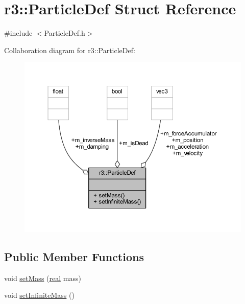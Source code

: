 \hypertarget{structr3_1_1_particle_def}{}\section{r3\+:\+:Particle\+Def Struct Reference}
\label{structr3_1_1_particle_def}


{\ttfamily \#include $<$Particle\+Def.\+h$>$}



Collaboration diagram for r3\+:\+:Particle\+Def\+:\nopagebreak
\begin{figure}[H]
\begin{center}
\leavevmode
\includegraphics[width=350pt]{structr3_1_1_particle_def__coll__graph}
\end{center}
\end{figure}
\subsection*{Public Member Functions}
\begin{DoxyCompactItemize}
\item 
void \mbox{\hyperlink{structr3_1_1_particle_def_a89966eea5b3ef424f105626dedb266e1}{set\+Mass}} (\mbox{\hyperlink{namespacer3_ab2016b3e3f743fb735afce242f0dc1eb}{real}} mass)
\item 
void \mbox{\hyperlink{structr3_1_1_particle_def_a779364b02815c9e4ea30678ea4031445}{set\+Infinite\+Mass}} ()
\end{DoxyCompactItemize}
